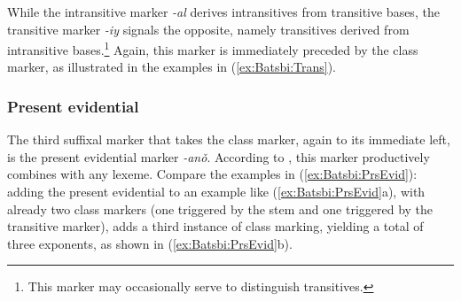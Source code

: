 \documentclass[output=paper]{langsci/langscibook}
\begin{document}
While the intransitive marker \textit{-al} derives intransitives from
transitive bases, the transitive marker \textit{-iy} signals the
opposite, namely transitives derived from intransitive
bases.\footnote{This marker may occasionally serve to distinguish
  transitives. %
} Again, this marker is immediately preceded by the class marker, as
illustrated in the examples in (\ref{ex:Batsbi:Trans}).

\begin{exe}
  \ex \label{ex:Batsbi:Trans}
  \begin{xlist}
    
  \end{xlist}
\end{exe}



\subsubsection{Present evidential}

The third suffixal marker that takes the class marker, again to its
immediate left, is the present evidential marker
\textit{-anǒ}. According to \citet{Harris09}, this marker productively
combines with any lexeme. Compare the examples in
(\ref{ex:Batsbi:PrsEvid}): adding the present evidential to an example
like (\ref{ex:Batsbi:PrsEvid}a), with already two class markers (one
triggered by the stem and one triggered by the transitive
marker), adds a third instance of class marking, yielding a total of
three exponents, as shown in (\ref{ex:Batsbi:PrsEvid}b).

\begin{exe}
  \ex \label{ex:Batsbi:PrsEvid}
  \begin{xlist}
    
  \end{xlist}
\end{exe}
\end{document}
